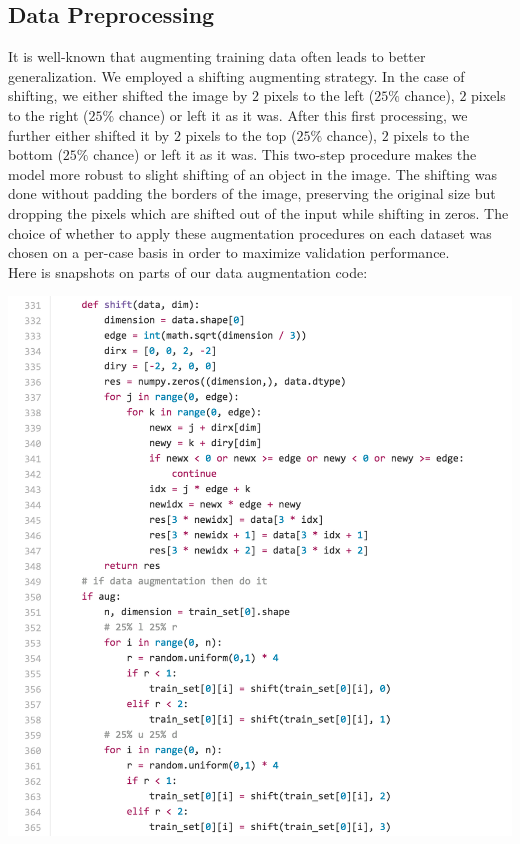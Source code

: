 \documentclass[final,leqno]{siamltex}
\begin{document}
\subsection{Data Preprocessing}
It is well-known that augmenting training data often leads to better generalization. We employed a shifting augmenting strategy. In the case of shifting, we either shifted the image by $2$ pixels to the left ($25\%$ chance), $2$ pixels to the right ($25\%$ chance) or left it as it was. After this first processing, we further either shifted it by $2$ pixels to the top ($25\%$ chance), $2$ pixels to the bottom ($25\%$ chance) or left it as it was. This two-step procedure makes the model more robust to slight shifting of an object in the image. The shifting was done without padding the borders of the image, preserving the original size but dropping the pixels which are shifted out of the input while shifting in zeros. The choice of whether to apply these augmentation procedures on each dataset was chosen on a per-case basis in order to maximize validation performance.\\

Here is snapshots on parts of our data augmentation code:\\

\begin{center}
\includegraphics[scale=0.6]{Figures/data_aug}	
\end{center}
\end{document}
